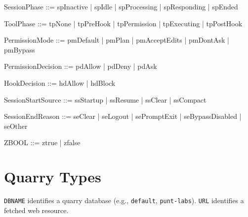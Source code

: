 \documentclass[a4paper,10pt,fleqn]{article}
\begin{document}
\begin{zed}
\end{zed}

\begin{zed}
  SessionPhase ::= spInactive | spIdle | spProcessing | spResponding | spEnded
\end{zed}

\begin{zed}
  ToolPhase ::= tpNone | tpPreHook | tpPermission | tpExecuting | tpPostHook
\end{zed}

\begin{zed}
  PermissionMode ::= pmDefault | pmPlan | pmAcceptEdits | pmDontAsk | pmBypass
\end{zed}

\begin{zed}
  PermissionDecision ::= pdAllow | pdDeny | pdAsk
\end{zed}

\begin{zed}
  HookDecision ::= hdAllow | hdBlock
\end{zed}

\begin{zed}
  SessionStartSource ::= ssStartup | ssResume | ssClear | ssCompact
\end{zed}

\begin{zed}
  SessionEndReason ::= seClear | seLogout | sePromptExit | seBypassDisabled | seOther
\end{zed}

\begin{zed}
  ZBOOL ::= ztrue | zfalse
\end{zed}

\section{Quarry Types}

\begin{zed}
\end{zed}

\texttt{DBNAME} identifies a quarry database (e.g., \texttt{default},
\texttt{punt-labs}). \texttt{URL} identifies a fetched web resource.
\end{document}
